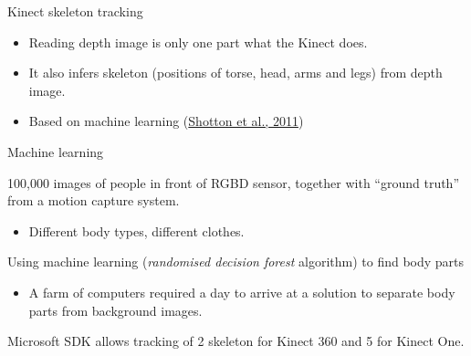 \documentclass[compress]{beamer}
\begin{document}
\begin{frame}{Kinect skeleton tracking}

    \begin{itemize}

        \item
              Reading depth image is only one part what the Kinect does.
        \item
              It also infers skeleton (positions of torse, head, arms and legs) from
              depth image.
        \item
              Based on machine learning
              (\href{http://research.microsoft.com/pubs/145347/BodyPartRecognition.pdf}{Shotton
              et al., 2011})
    \end{itemize}

\end{frame}

\begin{frame}{Machine learning}

    100,000 images of people in front of RGBD sensor, together with ``ground
    truth'' from a motion capture system.

    \begin{itemize}

        \item
              Different body types, different clothes.
    \end{itemize}

    Using machine learning (\emph{randomised decision forest} algorithm) to
    find body parts

    \begin{itemize}

        \item
              A farm of computers required a day to arrive at a solution to separate
              body parts from background images.
    \end{itemize}

    Microsoft SDK allows tracking of 2 skeleton for Kinect 360 and 5 for
    Kinect One.

\end{frame}
\end{document}
